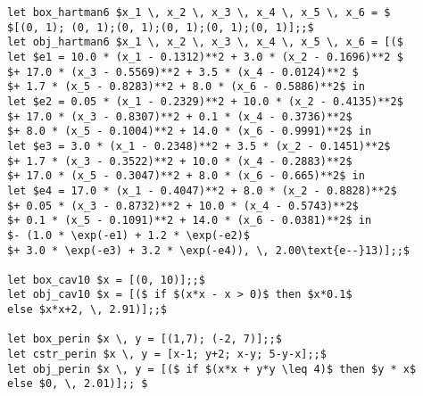 {\begin{lstlisting}
let box_hartman6 $x_1 \, x_2 \, x_3 \, x_4 \, x_5 \, x_6 = $
$[(0, 1); (0, 1);(0, 1);(0, 1);(0, 1);(0, 1)];;$
let obj_hartman6 $x_1 \, x_2 \, x_3 \, x_4 \, x_5 \, x_6 = [($
let $e1 = 10.0 * (x_1 - 0.1312)**2 + 3.0 * (x_2 - 0.1696)**2 $
$+ 17.0 * (x_3 - 0.5569)**2 + 3.5 * (x_4 - 0.0124)**2 $
$+ 1.7 * (x_5 - 0.8283)**2 + 8.0 * (x_6 - 0.5886)**2$ in
let $e2 = 0.05 * (x_1 - 0.2329)**2 + 10.0 * (x_2 - 0.4135)**2$ 
$+ 17.0 * (x_3 - 0.8307)**2 + 0.1 * (x_4 - 0.3736)**2$
$+ 8.0 * (x_5 - 0.1004)**2 + 14.0 * (x_6 - 0.9991)**2$ in
let $e3 = 3.0 * (x_1 - 0.2348)**2 + 3.5 * (x_2 - 0.1451)**2$ 
$+ 1.7 * (x_3 - 0.3522)**2 + 10.0 * (x_4 - 0.2883)**2$
$+ 17.0 * (x_5 - 0.3047)**2 + 8.0 * (x_6 - 0.665)**2$ in
let $e4 = 17.0 * (x_1 - 0.4047)**2 + 8.0 * (x_2 - 0.8828)**2$ 
$+ 0.05 * (x_3 - 0.8732)**2 + 10.0 * (x_4 - 0.5743)**2$
$+ 0.1 * (x_5 - 0.1091)**2 + 14.0 * (x_6 - 0.0381)**2$ in
$- (1.0 * \exp(-e1) + 1.2 * \exp(-e2)$
$+ 3.0 * \exp(-e3) + 3.2 * \exp(-e4)), \, 2.00\text{e--}13)];;$

let box_cav10 $x = [(0, 10)];;$
let obj_cav10 $x = [($ if $(x*x - x > 0)$ then $x*0.1$ 
else $x*x+2, \, 2.91)];;$

let box_perin $x \, y = [(1,7); (-2, 7)];;$
let cstr_perin $x \, y = [x-1; y+2; x-y; 5-y-x];;$
let obj_perin $x \, y = [($ if $(x*x + y*y \leq 4)$ then $y * x$
else $0, \, 2.01)];; $


\end{lstlisting}
}

